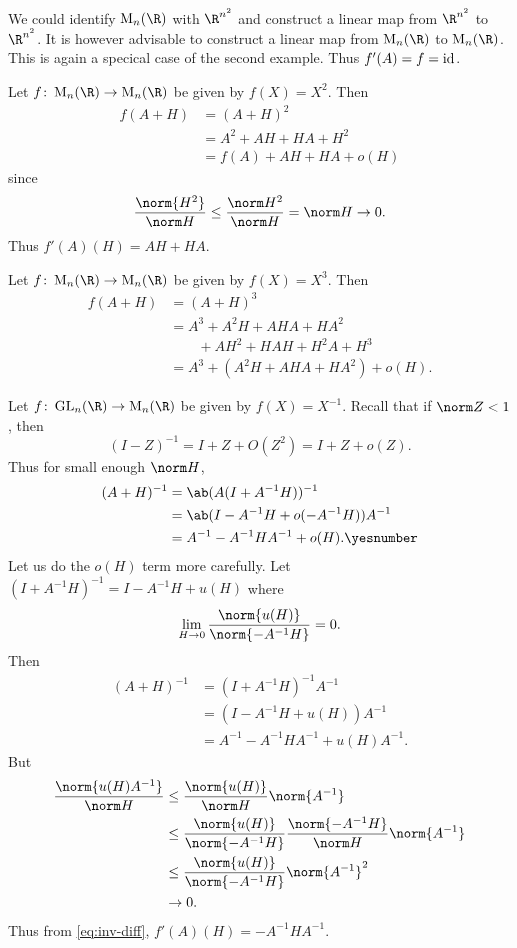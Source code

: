 \begin{examples}
    We could identify $\M_n(\R)$ with $\R^{n^2}$ and construct
    a linear map from $\R^{n^2}$ to $\R^{n^2}$.
    It is however advisable to construct a linear map from $\M_n(\R)$ to
    $\M_n(\R)$.
    This is again a specical case of the second example.
    Thus $f'(A) = f = \operatorname{id}$.
    \item Let $f\colon \M_n(\R) \to \M_n(\R)$ be given by $f(X) = X^2$.
    Then \begin{align*}
        f(A + H) &= (A + H)^2 \\
            &= A^2 + AH + HA + H^2 \\
            &= f(A) + AH + HA + o(H)
    \end{align*} since \[
        \frac{\norm{H^2}}{\norm H} \le \frac{\norm H^2}{\norm H}
            = \norm H \to 0.
    \]
    Thus $f'(A)(H) = AH + HA$.
    \item Let $f\colon \M_n(\R) \to \M_n(\R)$ be given by $f(X) = X^3$.
    Then \begin{align*}
        f(A + H) &= (A + H)^3 \\
            &= A^3 + A^2 H + A H A + H A^2 \\
            &\qquad+ A H^2 + H A H + H^2 A + H^3 \\
            &= A^3 + (A^2 H + A H A + H A^2) + o(H).
    \end{align*}
    \item Let $f\colon \GL_n(\R) \to \M_n(\R)$ be given by $f(X) = X^{-1}$.
    Recall that if $\norm Z < 1$, then \[
        (I - Z)^{-1} = I + Z + O(Z^2) = I + Z + o(Z).
    \] Thus for small enough $\norm H$, \begin{align*}
        (A + H)^{-1} &= \ab(A(I + A^{-1}H))^{-1} \\
            &= \ab(I - A^{-1}H + o(-A^{-1}H)) A^{-1} \\
            &= A^{-1} - A^{-1}HA^{-1} + o(H). \yesnumber \label{eq:inv-diff}
    \end{align*}
    Let us do the $o(H)$ term more carefully.
    Let $(I + A^{-1}H)^{-1} = I - A^{-1}H + u(H)$ where \[
        \lim_{H \to 0} \frac{\norm{u(H)}}{\norm {-A^{-1}H}} = 0.
    \] Then
    \begin{align*}
        (A + H)^{-1} &= (I + A^{-1}H)^{-1} A^{-1} \\
            &= (I - A^{-1}H + u(H)) A^{-1} \\
            &= A^{-1} - A^{-1}HA^{-1} + u(H)A^{-1}.
    \end{align*}
    But \begin{align*}
        \frac{\norm{u(H) A^{-1}}}{\norm H}
            &\le \frac{\norm{u(H)}}{\norm H} \norm{A^{-1}} \\
            &\le \frac{\norm{u(H)}}{\norm{-A^{-1}H}}
                \frac{\norm {-A^{-1}H}}{\norm H} \norm{A^{-1}} \\
            &\le \frac{\norm{u(H)}}{\norm{-A^{-1}H}} \norm{A^{-1}}^2 \\
            &\to 0.
    \end{align*}
    Thus from \cref{eq:inv-diff}, $f'(A)(H) = -A^{-1}HA^{-1}$.


\end{examples}
